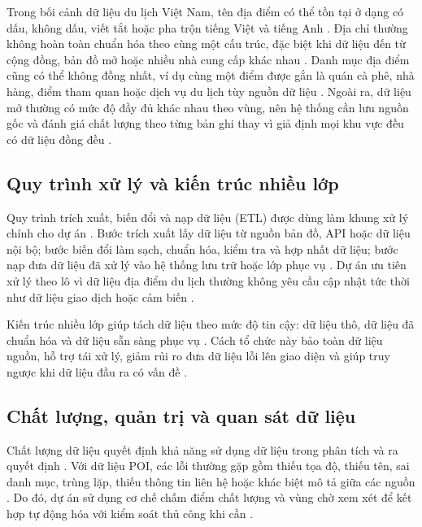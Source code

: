 \documentclass[12pt,a4paper]{article}
\begin{document}
Trong bối cảnh dữ liệu du lịch Việt Nam, tên địa điểm có thể tồn tại ở dạng có dấu, không dấu, viết tắt hoặc pha trộn tiếng Việt và tiếng Anh \cite{yeboah2021}. Địa chỉ thường không hoàn toàn chuẩn hóa theo cùng một cấu trúc, đặc biệt khi dữ liệu đến từ cộng đồng, bản đồ mở hoặc nhiều nhà cung cấp khác nhau \cite{yeboah2021}. Danh mục địa điểm cũng có thể không đồng nhất, ví dụ cùng một điểm được gắn là quán cà phê, nhà hàng, điểm tham quan hoặc dịch vụ du lịch tùy nguồn dữ liệu \cite{zhang2023}. Ngoài ra, dữ liệu mở thường có mức độ đầy đủ khác nhau theo vùng, nên hệ thống cần lưu nguồn gốc và đánh giá chất lượng theo từng bản ghi thay vì giả định mọi khu vực đều có dữ liệu đồng đều \cite{yeboah2021}.\par

\subsection{Quy trình xử lý và kiến trúc nhiều lớp}

Quy trình trích xuất, biến đổi và nạp dữ liệu (ETL) được dùng làm khung xử lý chính cho dự án \cite{ibmETL}. Bước trích xuất lấy dữ liệu từ nguồn bản đồ, API hoặc dữ liệu nội bộ; bước biến đổi làm sạch, chuẩn hóa, kiểm tra và hợp nhất dữ liệu; bước nạp đưa dữ liệu đã xử lý vào hệ thống lưu trữ hoặc lớp phục vụ \cite{ibmETL}. Dự án ưu tiên xử lý theo lô vì dữ liệu địa điểm du lịch thường không yêu cầu cập nhật tức thời như dữ liệu giao dịch hoặc cảm biến \cite{awsStreaming}.\par

Kiến trúc nhiều lớp giúp tách dữ liệu theo mức độ tin cậy: dữ liệu thô, dữ liệu đã chuẩn hóa và dữ liệu sẵn sàng phục vụ \cite{databricksMedallion}. Cách tổ chức này bảo toàn dữ liệu nguồn, hỗ trợ tái xử lý, giảm rủi ro đưa dữ liệu lỗi lên giao diện và giúp truy ngược khi dữ liệu đầu ra có vấn đề \cite{ibmLineage}.\par

\subsection{Chất lượng, quản trị và quan sát dữ liệu}

Chất lượng dữ liệu quyết định khả năng sử dụng dữ liệu trong phân tích và ra quyết định \cite{ibmDataQuality}. Với dữ liệu POI, các lỗi thường gặp gồm thiếu tọa độ, thiếu tên, sai danh mục, trùng lặp, thiếu thông tin liên hệ hoặc khác biệt mô tả giữa các nguồn \cite{yeboah2021}. Do đó, dự án sử dụng cơ chế chấm điểm chất lượng và vùng chờ xem xét để kết hợp tự động hóa với kiểm soát thủ công khi cần \cite{ibmDataQuality}.\par
\end{document}
